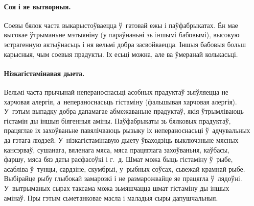 \paragraph{Соя і яе вытворныя.}
Соевы бялок часта выкарыстоўваецца ў~гатовай ежы і паўфабрыкатах. Ён мае высокае ўтрыманьне мэтыяніну (у параўнаньні зь іншымі бабовымі), высокую эстрагенную актыўнасьць і ня вельмі добра засвойваецца. Іншыя бабовыя больш карысныя, чым соевыя прадукты. Іх есьці можна, але ва ўмеранай колькасьці.

\paragraph{Нізкагістамінавая дыета.}
Вельмі часта прычынай непераноснасьці асобных прадуктаў зьяўляецца не харчовая алергія, а~непераноснасьць гістаміну (фальшывая харчовая алергія). У~гэтым выпадку добра дапамагае абмежаваньне прадуктаў, якія ўтрымліваюць гістамін ды іншыя біягенныя аміны. Паўфабрыкаты зь бялковых прадуктаў, працяглае іх захоўваньне павялічваюць рызыку іх непераноснасьці ў~адчувальных да гэтага людзей. У~нізкагістамінавую дыету ўваходзіць выключэньне мясных кансэрваў, сушанага, вяленага мяса, мяса працяглага захоўваньня, каўбасы, фаршу, мяса бяз даты расфасоўкі і г.~д. Шмат можа быць гістаміну ў~рыбе, асабліва ў~тунцы, сардзіне, скумбрыі, у~рыбных соўсах, сьвежай крамнай рыбе. Выбірайце рыбу глыбокай замарозкі і не размарожвайце яе працягла ў~лядоўні. У~вытрыманых сырах таксама можа зьмяшчацца шмат гістаміну ды іншых амінаў. Пры гэтым сьметанковае масла і маладыя сыры дапушчальныя.
